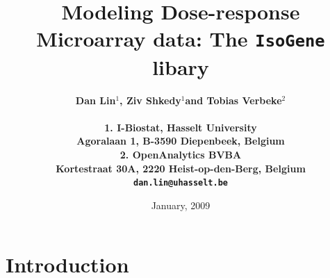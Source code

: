 \documentclass[10pt]{mybook4}
\newcommand{\markchapter}[1]{\markboth{
   \mbox{}\hfill {\it Chapter \thechapter}. \ {\it #1}  \hfill  \mbox{}\hspace{-\textwidth} \protect\rule[-2mm]{\textwidth}{.15mm}}{}}
\begin{document}

\title{
{\LARGE \bf
Modeling Dose-response Microarray data: The \texttt{IsoGene} libary\\[2cm]}}

\author{\large \bf Dan Lin$^1$, Ziv Shkedy$^1$and Tobias Verbeke$^2$  \\[2cm]\\
  1. I-Biostat, Hasselt University\\
  Agoralaan 1, B-3590 Diepenbeek, Belgium\\
  2. OpenAnalytics BVBA\\
  Kortestraat 30A, 2220 Heist-op-den-Berg, Belgium\\[2cm]
  \texttt{dan.lin@uhasselt.be}\\[2cm]
}

\date{January, 2009}
\maketitle
\clearpage\thispagestyle{empty}
\mbox{}

\newpage\thispagestyle{empty}
%

%

%


\tableofcontents


{}




\section{Introduction}
\end{document}
